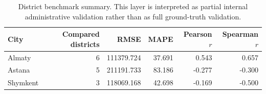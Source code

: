 \begin{table}[H]
\centering
\caption{District benchmark summary. This layer is interpreted as partial internal administrative validation rather than as full ground-truth validation.}
\label{tab:district-benchmark}
\begin{tabular}{lrrrrr}
\toprule
City & Compared districts & RMSE & MAPE & Pearson $r$ & Spearman $r$ \\
\midrule
Almaty & 6 & 111379.724 & 37.691 & 0.543 & 0.657 \\
Astana & 5 & 211191.733 & 83.186 & -0.277 & -0.300 \\
Shymkent & 3 & 118069.168 & 42.698 & -0.169 & -0.500 \\
\bottomrule
\end{tabular}
\end{table}
